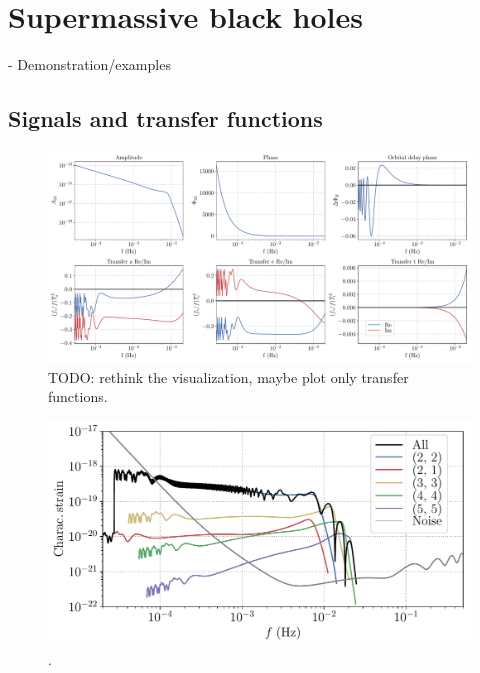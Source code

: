 \documentclass[aps,showpacs,twocolumn,prd,superscriptaddress,nofootinbib]{revtex4-1}
\newcommand{\SM}[1]{{\color{Blue} #1}}
\begin{document}

\section{Supermassive black holes}
\label{sec:SMBH}

- Demonstration/examples


\subsection{Signals and transfer functions}
\label{sec:signaltransfer}

\begin{figure}
  \centering
  \includegraphics[width=.98\linewidth]{../plots/plot_smbh9_tdi.pdf}
  \caption{\SM{TODO: rethink the visualization, maybe plot only transfer functions}.}
  \label{fig:tranferSMBHCase9}
\end{figure}

\begin{figure}
  \centering
  \includegraphics[width=.99\linewidth]{../plots/plot_hc_tdia_hm.pdf}
  \caption{.}
  \label{fig:FDHMSMBHCase9}
\end{figure}
\end{document}
